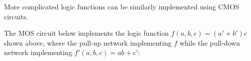 \documentclass{article}
\begin{document}
More complicated logic functions can be similarly implemented using CMOS
circuits.

The MOS circuit below implements the logic function $f(a,b,c)=(a'+b')c$
shown above, where the pull-up network implementing $f$ while the pull-down
network implementing $f'(a,b,c)=ab+c'$:

\end{document}
